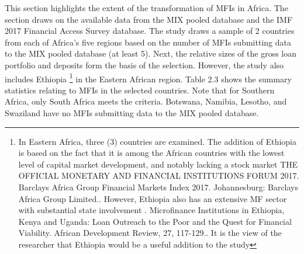 \documentclass[a4paper, nobind]{templates/ociamthesis}
\begin{document}
\noindent This section highlights the extent of the transformation of MFIs in Africa. The section draws on the available data from the MIX pooled database and the IMF 2017 Financial Access Survey database. The study draws a sample of 2 countries from each of Africa's five regions based on the number of MFIs submitting data to the MIX pooled database (at least 5). Next, the relative sizes of the gross loan portfolio and deposits form the basis of the selection. However, the study also includes Ethiopia \footnote{In Eastern Africa, three (3) countries are examined. The addition of Ethiopia is based on the fact that it is among the African countries with the lowest level of capital market development, and notably lacking a stock market THE OFFICIAL MONETARY AND FINANCIAL INSTITUTIONS FORUM 2017. Barclays Africa Group Financial Markets Index 2017. Johannesburg: Barclays Africa Group Limited.. However, Ethiopia also has an extensive MF sector with substantial state involvement \autocite{ayele2015microfinance}. Microfinance Institutions in Ethiopia, Kenya and Uganda: Loan Outreach to the Poor and the Quest for Financial Viability. African Development Review, 27, 117-129.. It is the view of the researcher that Ethiopia would be a useful addition to the study} in the Eastern African region. Table 2.3 shows the summary statistics relating to MFIs in the selected countries. Note that for Southern Africa, only South Africa meets the criteria. Botswana, Namibia, Lesotho, and Swaziland have no MFIs submitting data to the MIX pooled database.
\end{document}
